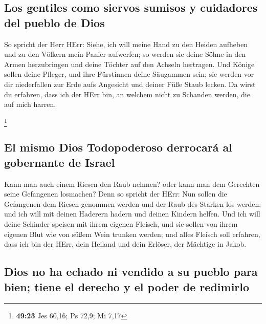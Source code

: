 \hypertarget{los-gentiles-como-siervos-sumisos-y-cuidadores-del-pueblo-de-dios}{%
\subsection{Los gentiles como siervos sumisos y cuidadores del pueblo de
Dios}\label{los-gentiles-como-siervos-sumisos-y-cuidadores-del-pueblo-de-dios}}

 So spricht der Herr HErr: Siehe, ich will meine Hand zu
den Heiden aufheben und zu den Völkern mein Panier aufwerfen; so werden
sie deine Söhne in den Armen herzubringen und deine Töchter auf den
Achseln hertragen.  Und Könige sollen deine Pfleger, und
ihre Fürstinnen deine Säugammen sein; sie werden vor dir niederfallen
zur Erde aufs Angesicht und deiner Füße Staub lecken. Da wirst du
erfahren, dass ich der HErr bin, an welchem nicht zu Schanden werden,
die auf mich harren.

\footnote{\textbf{49:23} Jes 60,16; Ps 72,9; Mi 7,17}

\hypertarget{el-mismo-dios-todopoderoso-derrocaruxe1-al-gobernante-de-israel}{%
\subsection{El mismo Dios Todopoderoso derrocará al gobernante de
Israel}\label{el-mismo-dios-todopoderoso-derrocaruxe1-al-gobernante-de-israel}}

 Kann man auch einem Riesen den Raub nehmen? oder kann
man dem Gerechten seine Gefangenen losmachen?  Denn so
spricht der HErr: Nun sollen die Gefangenen dem Riesen genommen werden
und der Raub des Starken los werden; und ich will mit deinen Haderern
hadern und deinen Kindern helfen.  Und ich will deine
Schinder speisen mit ihrem eigenen Fleisch, und sie sollen von ihrem
eigenen Blut wie von süßem Wein trunken werden; und alles Fleisch soll
erfahren, dass ich bin der HErr, dein Heiland und dein Erlöser, der
Mächtige in Jakob.

\hypertarget{dios-no-ha-echado-ni-vendido-a-su-pueblo-para-bien-tiene-el-derecho-y-el-poder-de-redimirlo}{%
\subsection{Dios no ha echado ni vendido a su pueblo para bien; tiene el
derecho y el poder de
redimirlo}\label{dios-no-ha-echado-ni-vendido-a-su-pueblo-para-bien-tiene-el-derecho-y-el-poder-de-redimirlo}}

